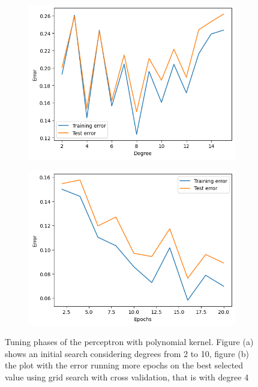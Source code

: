 \documentclass{article}
\begin{document}
\begin{figure}
	\centering
	\begin{subfigure}{0.45\columnwidth}
		\centering
		\includegraphics[width=\columnwidth]{../plots/kpoly_perceptron.png}
		\caption{}
		\label{subfig:kpoly_perceptron}
	\end{subfigure}
	\begin{subfigure}{0.45\columnwidth}
		\centering
		\includegraphics[width=\columnwidth]{../plots/kpoly2_perceptron.png}
		\caption{}
		\label{subfig:kpoly2_perceptron}
	\end{subfigure}
	\caption{Tuning phases of the perceptron with polynomial kernel. Figure (a) shows an initial search considering degrees from 2 to 10, figure (b) the plot with the error running more epochs on the best selected value using grid search with cross validation, that is with degree 4}
	\label{fig:kpoly_perceptron}
\end{figure}
\end{document}
